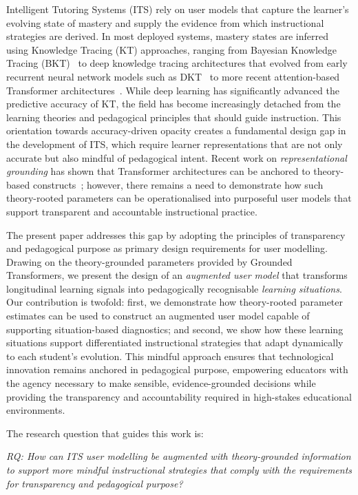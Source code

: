 \documentclass[runningheads]{llncs}
\begin{document}
Intelligent Tutoring Systems (ITS) \cite{itssleeman82} rely on user models that capture the learner's evolving state of mastery and supply the evidence from which instructional strategies are derived. In most deployed systems, mastery states are inferred using Knowledge Tracing (KT) approaches, ranging from Bayesian Knowledge Tracing (BKT)~\cite{corbett1994knowledge} to deep knowledge tracing architectures that evolved from early recurrent neural network models such as DKT~\cite{piech2015deep} to more recent attention-based Transformer architectures~\cite{ghosh2020context}. While deep learning has significantly advanced the predictive accuracy of KT, the field has become increasingly detached from the learning theories and pedagogical principles that should guide instruction. This orientation towards accuracy-driven opacity creates a fundamental design gap in the development of ITS, which require learner representations that are not only accurate but also mindful of pedagogical intent. Recent work on \textit{representational grounding} has shown that Transformer architectures can be anchored to theory-based constructs~\cite{labra2026theory}; however, there remains a need to demonstrate how such theory-rooted parameters can be operationalised into purposeful user models that support transparent and accountable instructional practice.

The present paper addresses this gap by adopting the principles of transparency and pedagogical purpose as primary design requirements for user modelling. Drawing on the theory-grounded parameters provided by Grounded Transformers, we present the design of an \textit{augmented user model} that transforms longitudinal learning signals into pedagogically recognisable \textit{learning situations}. Our contribution is twofold: first, we demonstrate how theory-rooted parameter estimates can be used to construct an augmented user model capable of supporting situation-based diagnostics; and second, we show how these learning situations support differentiated instructional strategies that adapt dynamically to each student's evolution. This mindful approach ensures that technological innovation remains anchored in pedagogical purpose, empowering educators with the agency necessary to make sensible, evidence-grounded decisions while providing the transparency and accountability required in high-stakes educational environments.

The research question that guides this work is: 

\textit{RQ: How can ITS user modelling be augmented with theory-grounded information to support more mindful instructional strategies that comply with the requirements for transparency and pedagogical purpose?}
\end{document}

